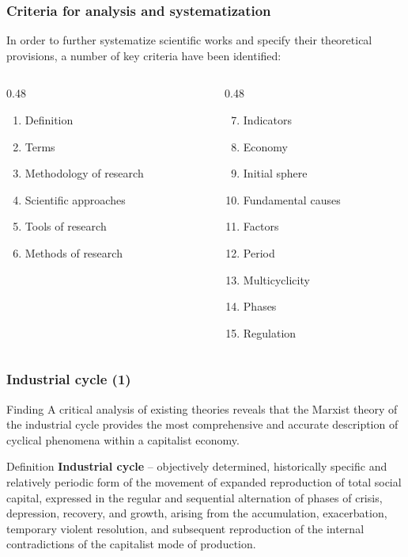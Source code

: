 \begin{frame}
  \frametitle{Criteria for analysis and systematization}
  In order to further systematize scientific works and specify their theoretical provisions, a number of key criteria have been identified:

  \begin{columns}[T,onlytextwidth]
  \begin{column}{0.48\textwidth}
    \begin{enumerate}
      \item Definition
      \item Terms
      \item Methodology of research
      \item Scientific approaches
      \item Tools of research
      \item Methods of research
    \end{enumerate}
  \end{column}

  \begin{column}{0.48\textwidth}
    \begin{enumerate}
      \setcounter{enumi}{6}
      \item Indicators
      \item Economy
      \item Initial sphere
      \item Fundamental causes
      \item Factors
      \item Period
      \item Multicyclicity
      \item Phases
      \item Regulation
    \end{enumerate}
  \end{column}
\end{columns}
\end{frame}

\begin{frame}
  \frametitle{Industrial cycle (1)}
  \begin{alertblock}{Finding}
    A critical analysis of existing theories reveals that the Marxist theory of the industrial cycle provides the most comprehensive and accurate description of cyclical phenomena within a capitalist economy.
  \end{alertblock}

  \begin{block}{Definition}
    \textbf{Industrial cycle} – objectively determined, historically specific and relatively periodic form of the movement of expanded reproduction of total social capital, expressed in the regular and sequential alternation of phases of crisis, depression, recovery, and growth, arising from the accumulation, exacerbation, temporary violent resolution, and subsequent reproduction of the internal contradictions of the capitalist mode of production.
  \end{block}
\end{frame}

